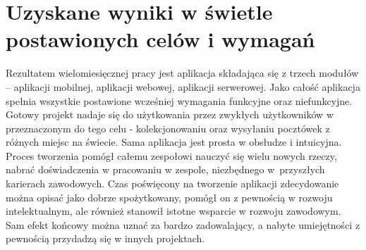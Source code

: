 \documentclass[a4paper,twoside,12pt]{book}
\begin{document}
\section{Uzyskane wyniki w świetle postawionych celów i wymagań}
Rezultatem wielomiesięcznej pracy jest aplikacja składająca się z trzech modułów -- aplikacji mobilnej, aplikacji webowej, aplikacji serwerowej. Jako całość aplikacja spełnia wszystkie postawione wcześniej wymagania funkcyjne oraz niefunkcyjne.
Gotowy projekt nadaje się do użytkowania przez zwykłych użytkowników w przeznaczonym do tego celu - kolekcjonowaniu oraz wysyłaniu pocztówek z różnych miejsc na świecie. Sama aplikacja jest prosta w obsłudze i intuicyjna.
Proces tworzenia pomógł całemu zespołowi nauczyć się wielu nowych rzeczy, nabrać doświadczenia w pracowaniu w zespole, niezbędnego w~przyszłych karierach zawodowych. Czas poświęcony na tworzenie aplikacji zdecydowanie można opisać jako dobrze spożytkowany, pomógł on z pewnością w rozwoju intelektualnym, ale również stanowił istotne wsparcie w rozwoju zawodowym. Sam efekt końcowy można uznać za bardzo zadowalający, a nabyte umiejętności z pewnością przydadzą się w innych projektach.




\backmatter

\printbibliography           %
\end{document}
